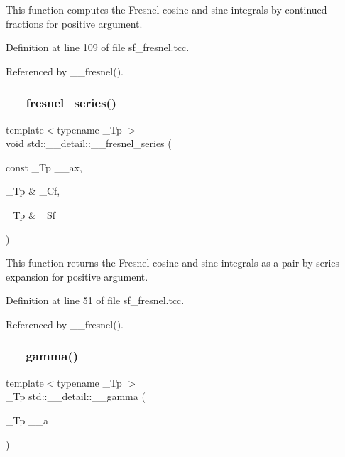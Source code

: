 This function computes the Fresnel cosine and sine integrals by continued fractions for positive argument. 



Definition at line 109 of file sf\+\_\+fresnel.\+tcc.



Referenced by \+\_\+\+\_\+fresnel().

\mbox{\label{namespacestd_1_1____detail_aae7775bc46d621e54fb9d994c2f35e2a}} 
\subsubsection{\texorpdfstring{\+\_\+\+\_\+fresnel\+\_\+series()}{\_\_fresnel\_series()}}
{\footnotesize\ttfamily template$<$typename \+\_\+\+Tp $>$ \\
void std\+::\+\_\+\+\_\+detail\+::\+\_\+\+\_\+fresnel\+\_\+series (\begin{DoxyParamCaption}\item[{const \+\_\+\+Tp}]{\+\_\+\+\_\+ax,  }\item[{\+\_\+\+Tp \&}]{\+\_\+\+Cf,  }\item[{\+\_\+\+Tp \&}]{\+\_\+\+Sf }\end{DoxyParamCaption})}



This function returns the Fresnel cosine and sine integrals as a pair by series expansion for positive argument. 



Definition at line 51 of file sf\+\_\+fresnel.\+tcc.



Referenced by \+\_\+\+\_\+fresnel().

\mbox{\label{namespacestd_1_1____detail_a178e0b2cc0ae66b7d958e837da4fe4c1}} 
\subsubsection{\texorpdfstring{\+\_\+\+\_\+gamma()}{\_\_gamma()}\hspace{0.1cm}{\footnotesize\ttfamily [1/2]}}
{\footnotesize\ttfamily template$<$typename \+\_\+\+Tp $>$ \\
\+\_\+\+Tp std\+::\+\_\+\+\_\+detail\+::\+\_\+\+\_\+gamma (\begin{DoxyParamCaption}\item[{\+\_\+\+Tp}]{\+\_\+\+\_\+a }\end{DoxyParamCaption})}



